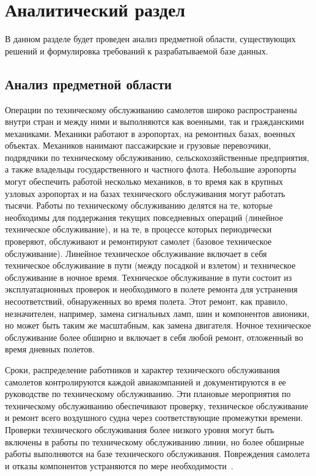 \chapter{Аналитический раздел}


В данном разделе будет проведен анализ предметной области, существующих решений и формулировка требований к разрабатываемой базе данных.

\section{Анализ предметной области}

Операции по техническому обслуживанию самолетов широко распространены внутри стран и между ними и выполняются как военными, так и гражданскими механиками.
Механики работают в аэропортах, на ремонтных базах, военных объектах.
Механиков нанимают пассажирские и грузовые перевозчики, подрядчики по техническому обслуживанию, сельскохозяйственные предприятия, а также владельцы государственного и частного флота.
Небольшие аэропорты могут обеспечить работой несколько механиков, в то время как в крупных узловых аэропортах и на базах технического обслуживания могут работать тысячи.
Работы по техническому обслуживанию делятся на те, которые необходимы для поддержания текущих повседневных операций (линейное техническое обслуживание), и на те, в процессе которых периодически проверяют, обслуживают и ремонтируют самолет (базовое техническое обслуживание).
Линейное техническое обслуживание включает в себя техническое обслуживание в пути (между посадкой и взлетом) и техническое обслуживание в ночное время.
Техническое обслуживание в пути состоит из эксплуатационных проверок и необходимого в полете ремонта для устранения несоответствий, обнаруженных во время полета.
Этот ремонт, как правило, незначителен, например, замена сигнальных ламп, шин и компонентов авионики, но может быть таким же масштабным, как замена двигателя.
Ночное техническое обслуживание более обширно и включает в себя любой ремонт, отложенный во время дневных полетов.

Сроки, распределение работников и характер технического обслуживания самолетов контролируются каждой авиакомпанией и документируются в ее руководстве по техническому обслуживанию.
Эти плановые мероприятия по техническому обслуживанию обеспечивают проверку, техническое обслуживание и ремонт всего воздушного судна через соответствующие промежутки времени.
Проверки технического обслуживания более низкого уровня могут быть включены в работы по техническому обслуживанию линии, но более обширные работы выполняются на базе технического обслуживания.
Повреждения самолета и отказы компонентов устраняются по мере необходимости~\cite{otplane}.

